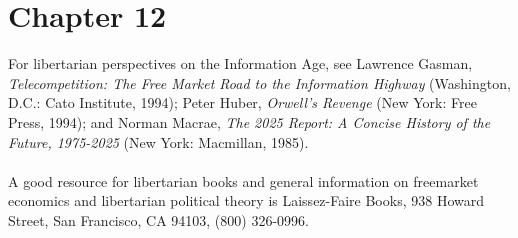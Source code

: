 \section*{Chapter 12}
For libertarian perspectives on the Information Age, see Lawrence Gasman, \textit{Telecompetition: The Free Market Road to the Information Highway} (Washington, D.C.: Cato Institute, 1994); Peter Huber, \textit{Orwell's Revenge} (New
York: Free Press, 1994); and Norman Macrae, \textit{The 2025 Report: A Concise
History of the Future, 1975-2025} (New York: Macmillan, 1985).
\\
\\
A good resource for libertarian books and general information on freemarket economics and libertarian political theory is Laissez-Faire Books, 938
Howard Street, San Francisco, CA 94103, (800) 326-0996.